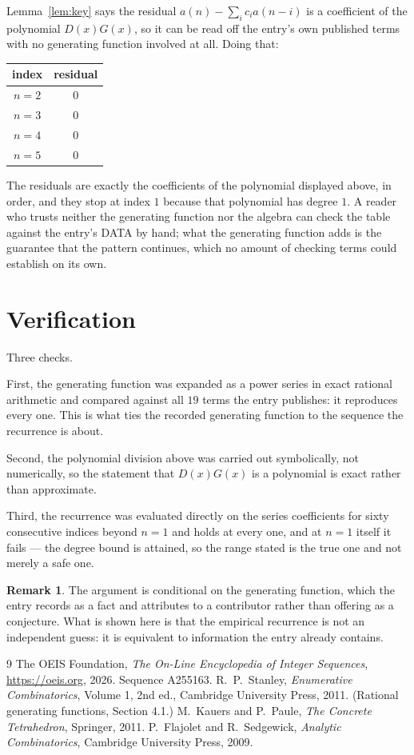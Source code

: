 \documentclass[11pt,a4paper]{article}
\theoremstyle{plain}
\theoremstyle{definition}
\newtheorem{remark}[theorem]{Remark}
\begin{document}
Lemma~\ref{lem:key} says the residual $a(n)-\sum_ic_ia(n-i)$ is a coefficient of the
polynomial $D(x)G(x)$, so it can be read off the entry's own published terms with no
generating function involved at all. Doing that:
\begin{center}
\begin{tabular}{cc}
index & residual \\ \hline
$n=2$ & $0$ \\
$n=3$ & $0$ \\
$n=4$ & $0$ \\
$n=5$ & $0$
\end{tabular}
\end{center}
The residuals are exactly the coefficients of the polynomial displayed above, in order, and
they stop at index $1$ because that polynomial has degree $1$. A reader who trusts
neither the generating function nor the algebra can check the table against the entry's DATA
by hand; what the generating function adds is the guarantee that the pattern continues, which
no amount of checking terms could establish on its own.

\section{Verification}

Three checks.

First, the generating function was expanded as a power series in exact rational arithmetic and
compared against all $19$ terms the entry publishes: it reproduces every one. This is
what ties the recorded generating function to the sequence the recurrence is about.

Second, the polynomial division above was carried out symbolically, not numerically, so the
statement that $D(x)G(x)$ is a polynomial is exact rather than approximate.

Third, the recurrence was evaluated directly on the series coefficients for sixty consecutive
indices beyond $n=1$ and holds at every one, and at $n=1$ itself it fails --- the
degree bound is attained, so the range stated is the true one and not merely a safe one.

\begin{remark}
The argument is conditional on the generating function, which the entry records as a fact and
attributes to a contributor rather than offering as a conjecture. What is shown here is that
the empirical recurrence is not an independent guess: it is equivalent to information the
entry already contains.
\end{remark}

\begin{thebibliography}{9}
 The OEIS Foundation, \emph{The On-Line Encyclopedia of Integer
Sequences}, \url{https://oeis.org}, 2026. Sequence A255163.
 R.~P.~Stanley, \emph{Enumerative Combinatorics}, Volume 1, 2nd ed.,
Cambridge University Press, 2011. (Rational generating functions, Section 4.1.)
 M.~Kauers and P.~Paule, \emph{The Concrete Tetrahedron}, Springer, 2011.
 P.~Flajolet and R.~Sedgewick, \emph{Analytic Combinatorics}, Cambridge
University Press, 2009.
\end{thebibliography}
\end{document}
